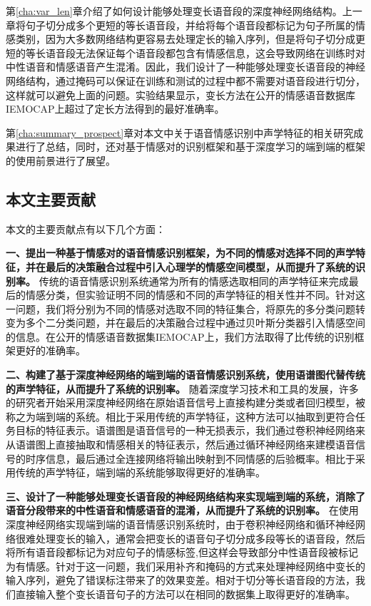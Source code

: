  第\ref{cha:var_len}章介绍了如何设计能够处理变长语音段的深度神经网络结构。上一章将句子切分成多个更短的等长语音段，并给将每个语音段都标记为句子所属的情感类别，因为大多数网络结构更容易去处理定长的输入序列，但是将句子切分成更短的等长语音段无法保证每个语音段都包含有情感信息，这会导致网络在训练时对中性语音和情感语音产生混淆。因此，我们设计了一种能够处理变长语音段的神经网络结构，通过掩码可以保证在训练和测试的过程中都不需要对语音段进行切分，这样就可以避免上面的问题。实验结果显示，变长方法在公开的情感语音数据库IEMOCAP上超过了定长方法得到的最好准确率。

 第\ref{cha:summary_prospect}章对本文中关于语音情感识别中声学特征的相关研究成果进行了总结，同时，还对基于情感对的识别框架和基于深度学习的端到端的框架的使用前景进行了展望。

\subsection{本文主要贡献}
\label{ssec:contribution}
本文的主要贡献点有以下几个方面：

\textbf{一、提出一种基于情感对的语音情感识别框架，为不同的情感对选择不同的声学特征，并在最后的决策融合过程中引入心理学的情感空间模型，从而提升了系统的识别率。} 传统的语音情感识别系统通常为所有的情感选取相同的声学特征来完成最后的情感分类，但实验证明不同的情感和不同的声学特征的相关性并不同。针对这一问题，我们将分别为不同的情感对选取不同的特征集合，将原先的多分类问题转变为多个二分类问题，并在最后的决策融合过程中通过贝叶斯分类器引入情感空间的信息。在公开的情感语音数据集IEMOCAP上，我们方法取得了比传统的识别框架更好的准确率。

\textbf{二、构建了基于深度神经网络的端到端的语音情感识别系统，使用语谱图代替传统的声学特征，从而提升了系统的识别率。} 随着深度学习技术和工具的发展，许多的研究者开始采用深度神经网络在原始语音信号上直接构建分类或者回归模型，被称之为端到端的系统。相比于采用传统的声学特征，这种方法可以抽取到更符合任务目标的特征表示。语谱图是语音信号的一种无损表示，我们通过卷积神经网络来从语谱图上直接抽取和情感相关的特征表示，然后通过循环神经网络来建模语音信号的时序信息，最后通过全连接网络将输出映射到不同情感的后验概率。相比于采用传统的声学特征，端到端的系统能够取得更好的准确率。

\textbf{三、设计了一种能够处理变长语音段的神经网络结构来实现端到端的系统，消除了语音分段带来的中性语音和情感语音的混淆，从而提升了系统的识别率。} 在使用深度神经网络实现端到端的语音情感识别系统时，由于卷积神经网络和循环神经网络很难处理变长的输入，通常会把变长的语音句子切分成多段等长的语音段，然后将所有语音段都标记为对应句子的情感标签,但这样会导致部分中性语音段被标记为有情感。针对于这一问题，我们采用补齐和掩码的方式来处理神经网络中变长的输入序列，避免了错误标注带来了的效果变差。相对于切分等长语音段的方法，我们直接输入整个变长语音句子的方法可以在相同的数据集上取得更好的准确率。


